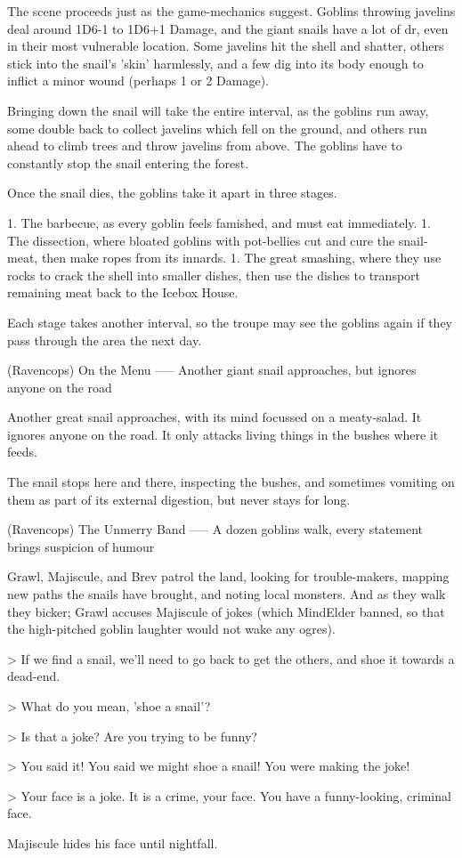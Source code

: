 The scene proceeds just as the game-mechanics suggest.
Goblins throwing javelins deal around 1D6-1 to 1D6+1 Damage, and the giant snails have a lot of \gls{dr}, even in their most vulnerable location.
Some javelins hit the shell and shatter, others stick into the snail's 'skin' harmlessly, and a few dig into its body enough to inflict a minor wound (perhaps 1 or 2 Damage).

Bringing down the snail will take the entire \gls{interval}, as the goblins run away, some double back to collect javelins which fell on the ground, and others run ahead to climb trees and throw javelins from above.
The goblins have to constantly stop the snail entering the forest.

Once the snail dies,
the goblins take it apart in three stages.

1. The barbecue, as every goblin feels famished, and must eat immediately.
1. The dissection, where bloated goblins with pot-bellies cut and cure the snail-meat, then make ropes from its innards.
1. The great smashing, where they use rocks to crack the shell into smaller dishes, then use the dishes to transport remaining meat back to the Icebox House.

Each stage takes another \gls{interval}, so the troupe may see the goblins again if they pass through the area the next day.

(Ravencops) On the Menu
-----
{Another giant snail approaches, but ignores anyone on the road}

Another great snail approaches, with its mind focussed on a meaty-salad.
It ignores anyone on the road.
It only attacks living things in the bushes where it feeds.

The snail stops here and there, inspecting the bushes, and sometimes vomiting on them as part of its external digestion, but never stays for long.


(Ravencops) The Unmerry Band
-----
{A dozen goblins walk, every statement brings suspicion of humour}

Grawl, Majiscule, and Brev patrol the land, looking for trouble-makers, mapping new paths the snails have brought, and noting local monsters.
And as they walk they bicker; Grawl accuses Majiscule of jokes (which \gls{MindElder} banned, so that the high-pitched goblin laughter would not wake any ogres).

> If we find a snail, we'll need to go back to get the others, and shoe it towards a dead-end.

> What do you mean, 'shoe a snail'?

> Is that a joke?  Are you trying to be funny?

> You said it!  You said we might shoe a snail!  You were making the joke!

> Your face is a joke.  It is a crime, your face.  You have a funny-looking, criminal face.

Majiscule hides his face until nightfall.
